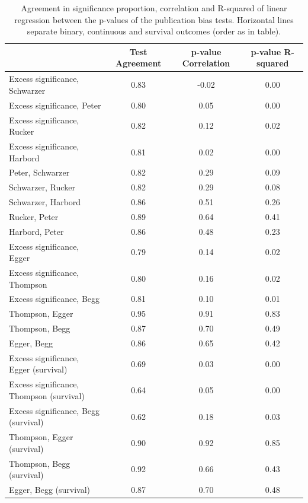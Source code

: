 \documentclass[11pt,a4paper,twoside]{book}\usepackage[]{graphicx}\usepackage[]{color}
\begin{document}
\begin{table}[ht]
\centering
\begingroup\footnotesize
\begin{tabular}{lccc}
  & Test Agreement & p-value Correlation & p-value R-squared \\ 
  \hline
\hline
Excess significance, Schwarzer & 0.83 & -0.02 & 0.00 \\ 
  Excess significance, Peter & 0.80 & 0.05 & 0.00 \\ 
  Excess significance, Rucker & 0.82 & 0.12 & 0.02 \\ 
  Excess significance, Harbord & 0.81 & 0.02 & 0.00 \\ 
  Peter, Schwarzer & 0.82 & 0.29 & 0.09 \\ 
  Schwarzer, Rucker & 0.82 & 0.29 & 0.08 \\ 
  Schwarzer, Harbord & 0.86 & 0.51 & 0.26 \\ 
  Rucker, Peter & 0.89 & 0.64 & 0.41 \\ 
  Harbord, Peter & 0.86 & 0.48 & 0.23 \\ 
   \hline
Excess significance, Egger & 0.79 & 0.14 & 0.02 \\ 
  Excess significance, Thompson & 0.80 & 0.16 & 0.02 \\ 
  Excess significance, Begg & 0.81 & 0.10 & 0.01 \\ 
  Thompson, Egger & 0.95 & 0.91 & 0.83 \\ 
  Thompson, Begg & 0.87 & 0.70 & 0.49 \\ 
  Egger, Begg & 0.86 & 0.65 & 0.42 \\ 
   \hline
Excess significance, Egger (survival) & 0.69 & 0.03 & 0.00 \\ 
  Excess significance, Thompson (survival) & 0.64 & 0.05 & 0.00 \\ 
  Excess significance, Begg (survival) & 0.62 & 0.18 & 0.03 \\ 
  Thompson, Egger (survival) & 0.90 & 0.92 & 0.85 \\ 
  Thompson, Begg (survival) & 0.92 & 0.66 & 0.43 \\ 
  Egger, Begg (survival) & 0.87 & 0.70 & 0.48 \\ 
   \hline
\end{tabular}
\endgroup
\caption{Agreement in significance proportion, correlation and R-squared of linear regression
             between the p-values of the publication bias tests. Horizontal lines separate binary, continuous and survival outcomes (order as in table).} 
\label{test.agreement}
\end{table}
\end{document}
